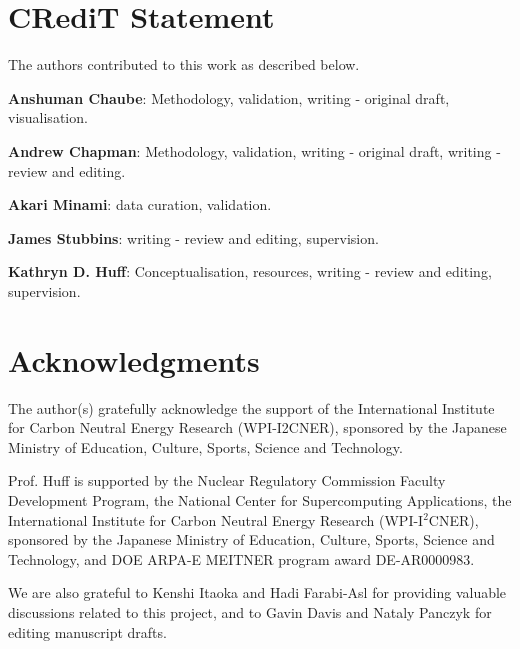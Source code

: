 \section{CRediT Statement}

The authors contributed to this work as described below.

\textbf{Anshuman Chaube}: Methodology, validation, writing - original draft, visualisation.

\textbf{Andrew Chapman}: Methodology, validation,  writing - original draft, writing - review and editing.

\textbf{Akari Minami}: data curation, validation.

\textbf{James Stubbins}: writing - review and editing, supervision. 

\textbf{Kathryn D. Huff}: Conceptualisation, resources, writing - review and editing, supervision.

\section{Acknowledgments}

The author(s) gratefully acknowledge the support of the International Institute for Carbon Neutral Energy Research (WPI-I2CNER), sponsored by the Japanese Ministry of Education, Culture, Sports, Science and Technology. 

Prof. Huff is supported by the Nuclear Regulatory Commission Faculty Development Program, the National Center for Supercomputing Applications, the International Institute for Carbon Neutral Energy Research (WPI-I$^2$CNER), sponsored by the Japanese Ministry of Education, Culture, Sports, Science and Technology, and  DOE ARPA-E MEITNER program award DE-AR0000983.

We are also grateful to Kenshi Itaoka and Hadi Farabi-Asl for providing valuable discussions related to this project, and to Gavin Davis and Nataly Panczyk for editing manuscript drafts.